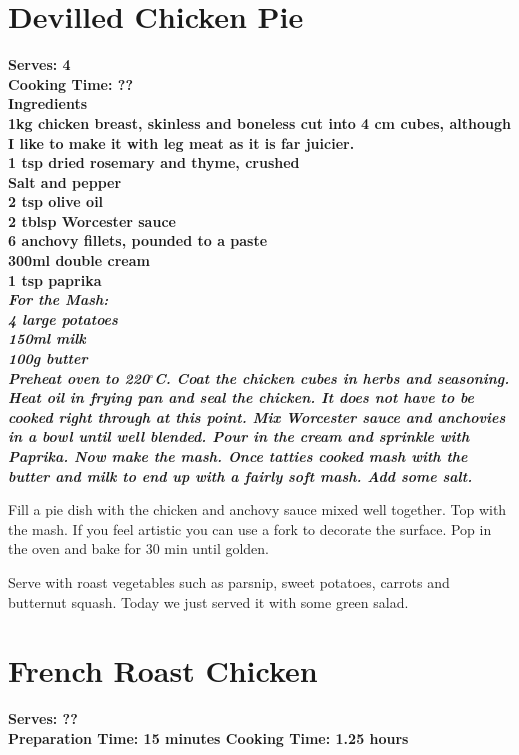 \documentclass[18pt, oneside]{book}
\begin{document}
\section{Devilled Chicken Pie}


\bf{Serves: 4} \\
\bf{Cooking Time: ??} \\

\bf{Ingredients} \normalfont \\
1kg chicken breast, skinless and boneless cut into 4 cm cubes, 
although I like to make it with leg meat as it is far juicier. \\
1 tsp dried rosemary and thyme, crushed \\
Salt and pepper \\
2 tsp olive oil \\
2 tblsp Worcester sauce \\
6 anchovy fillets, pounded to a paste \\
300ml double cream \\
1 tsp paprika \\

\it{For the Mash: }\normalfont \\
4 large potatoes \\
150ml milk \\
100g butter \\

Preheat oven to 220$^{\circ}$C. Coat the chicken cubes in herbs and seasoning. Heat oil in frying pan and seal the chicken. It does not have to be cooked right through at this point. Mix Worcester sauce and anchovies in a bowl until well blended. Pour in the cream and sprinkle with Paprika. Now make the mash. Once tatties cooked mash with the butter and milk to end up with a fairly soft mash. Add some salt.

Fill a pie dish with the chicken and anchovy sauce mixed well together. Top with the mash. If you feel artistic you can use a fork to decorate the surface. Pop in the oven and bake for 30 min until golden.

Serve with roast vegetables such as parsnip, sweet potatoes, carrots and butternut squash. Today we just served it with some green salad.

\section{French Roast Chicken}

\bf{Serves: ??} \\
\bf{Preparation Time: 15  minutes}
\bf{Cooking Time: 1.25 hours} \\ 
\end{document}
